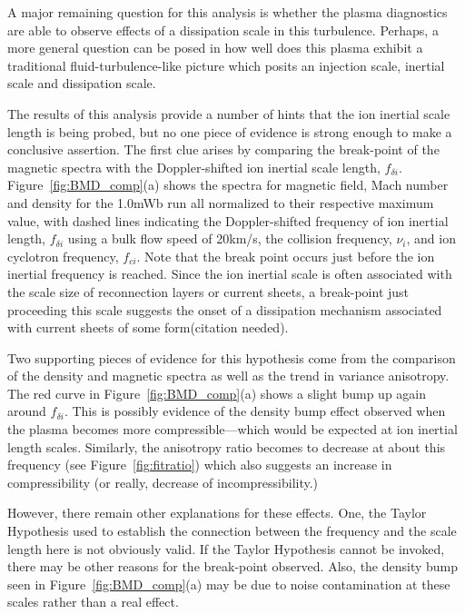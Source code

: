 \documentclass[aip,prl,amsmath,amssymb,reprint,superscriptaddress]{revtex4-1} %
\begin{document}
A major remaining question for this analysis is whether the plasma diagnostics are able to observe effects of a dissipation scale in this turbulence. Perhaps, a more general question can be posed in how well does this plasma exhibit a traditional fluid-turbulence-like picture which posits an injection scale, inertial scale and dissipation scale.

The results of this analysis provide a number of hints that the ion inertial scale length is being probed, but no one piece of evidence is strong enough to make a conclusive assertion. The first clue arises by comparing the break-point of the magnetic spectra with the Doppler-shifted ion inertial scale length, $f_{\delta i}$. Figure~\ref{fig:BMD_comp}(a) shows the spectra for magnetic field, Mach number and density for the 1.0mWb run all normalized to their respective maximum value, with dashed lines indicating the Doppler-shifted frequency of ion inertial length, $f_{\delta i}$ using a bulk flow speed of 20km/s, the collision frequency, $\nu_{i}$, and ion cyclotron frequency, $f_{ci}$. Note that the break point occurs just before the ion inertial frequency is reached. Since the ion inertial scale is often associated with the scale size of reconnection layers or current sheets, a break-point just proceeding this scale suggests the onset of a dissipation mechanism associated with current sheets of some form(citation needed).

Two supporting pieces of evidence for this hypothesis come from the comparison of the density and magnetic spectra as well as the trend in variance anisotropy. The red curve in Figure~\ref{fig:BMD_comp}(a) shows a slight bump up again around $f_{\delta i}$. This is possibly evidence of the density bump effect observed when the plasma becomes more compressible---which would be expected at ion inertial length scales. Similarly, the anisotropy ratio becomes to decrease at about this frequency (see Figure~\ref{fig:fitratio}) which also suggests an increase in compressibility (or really, decrease of incompressibility.)

However, there remain other explanations for these effects. One, the Taylor Hypothesis used to establish the connection between the frequency and the scale length here is not obviously valid. If the Taylor Hypothesis cannot be invoked, there may be other reasons for the break-point observed. Also, the density bump seen in Figure~\ref{fig:BMD_comp}(a) may be due to noise contamination at these scales rather than a real effect.
\end{document}
